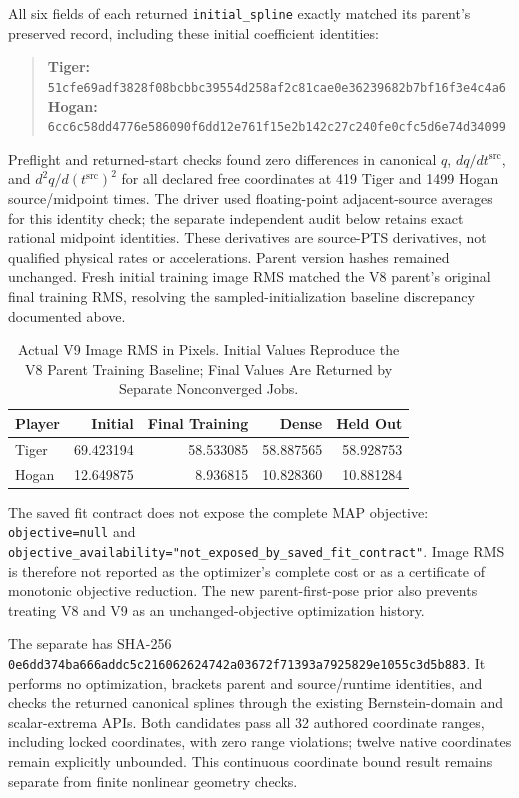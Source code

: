 \documentclass[11pt,letterpaper]{article}
\newcommand{\code}[1]{\nolinkurl{#1}}
\newcommand{\hash}[1]{{\footnotesize\nolinkurl{#1}}}
\begin{document}
All six fields of each returned \code{initial_spline} exactly matched its
parent's preserved record, including these initial coefficient identities:
\begin{quote}\small
\textbf{Tiger:}
\hash{51cfe69adf3828f08bcbbc39554d258af2c81cae0e36239682b7bf16f3e4c4a6}\\
\textbf{Hogan:}
\hash{6cc6c58dd4776e586090f6dd12e761f15e2b142c27c240fe0cfc5d6e74d34099}
\end{quote}
Preflight and returned-start checks found zero differences in canonical
$q$, $dq/dt^{\mathrm{src}}$, and $d^2q/d(t^{\mathrm{src}})^2$ for all declared
free coordinates at 419 Tiger and 1499 Hogan source/midpoint times. The driver
used floating-point adjacent-source averages for this identity check; the
separate independent audit below retains exact rational midpoint identities.
These derivatives are source-PTS derivatives, not qualified physical rates or
accelerations. Parent version hashes remained unchanged. Fresh initial
training image RMS matched the V8 parent's original final training RMS,
resolving the sampled-initialization baseline discrepancy documented above.

\begin{table}[ht]\centering\small
\begin{tabular}{@{}lrrrr@{}}
\toprule Player & Initial & Final Training & Dense & Held Out\\\midrule
Tiger & 69.423194 & 58.533085 & 58.887565 & 58.928753\\
Hogan & 12.649875 & 8.936815 & 10.828360 & 10.881284\\
\bottomrule
\end{tabular}
\caption{Actual V9 Image RMS in Pixels. Initial Values Reproduce the V8 Parent
Training Baseline; Final Values Are Returned by Separate Nonconverged Jobs.}
\end{table}
The saved fit contract does not expose the complete MAP objective:
\code{objective=null} and
\code{objective_availability="not_exposed_by_saved_fit_contract"}.
Image RMS is therefore not reported as the optimizer's complete cost or as a
certificate of monotonic objective reduction. The new parent-first-pose prior
also prevents treating V8 and V9 as an unchanged-objective optimization history.

The separate 
has SHA-256
\hash{0e6dd374ba666addc5c216062624742a03672f71393a7925829e1055c3d5b883}.
It performs no optimization, brackets parent and source/runtime identities,
and checks the returned canonical splines through the existing Bernstein-domain
and scalar-extrema APIs. Both candidates pass all 32 authored coordinate
ranges, including locked coordinates, with zero range violations; twelve
native coordinates remain explicitly unbounded. This continuous coordinate
bound result remains separate from finite nonlinear geometry checks.
\end{document}
